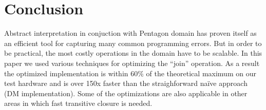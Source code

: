 \documentclass[letterpaper]{article}
\newcommand{\mypar}[1]{{\bf #1.}}
\begin{document}
%
%
%
%
%

\section{Conclusion}
Abstract interpretation in conjuction with Pentagon domain has proven itself as an efficient tool for
capturing many common programming errors. But in order to be practical, the most costly operations in the domain
have to be scalable. In this paper we used various techniques for optimizing the ``join'' operation. As a result the optimized
implementation is within 60\% of the theoretical maximum on our test hardware and is over 150x faster than 
the straighforward na\"ive approach (DM implementation). Some of the optimizations are also applicable in other areas in which
fast transitive closure is needed.
\end{document}
